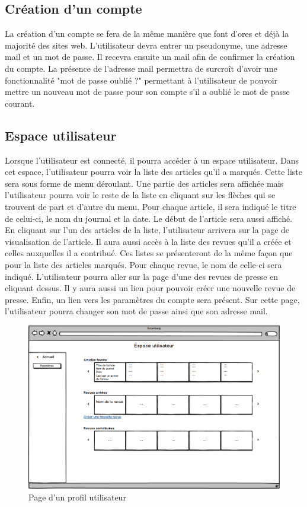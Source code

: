 \subsection{Création d'un compte}
\label{creation_compte}


La création d'un compte se fera de la même manière que font d'ores et déjà la majorité des sites web. L'utilisateur devra entrer un pseudonyme, une adresse mail et un mot de passe. Il recevra ensuite un mail afin de confirmer la création du compte. La présence de l'adresse mail permettra de surcroît d'avoir une fonctionnalité "mot de passe oublié ?" permettant à l'utilisateur de pouvoir mettre un nouveau mot de passe pour son compte s'il a oublié le mot de passe courant.


\subsection{Espace utilisateur}
\label{espace_util}

Lorsque l'utilisateur est connecté, il pourra accéder à un espace utilisateur. Dans cet espace, l'utilisateur pourra voir la liste des articles qu'il a marqués. Cette liste sera sous forme de menu déroulant. Une partie des articles sera affichée mais l'utilisateur pourra voir le reste de la liste en cliquant sur les flèches qui se trouvent de part et d'autre du menu. Pour chaque article, il sera indiqué le titre de celui-ci, le nom du journal et la date. Le début de l'article sera aussi affiché. En cliquant sur l'un des articles de la liste, l'utilisateur arrivera sur la page de visualisation de l'article.
Il aura aussi accès à la liste des revues qu'il a créée et celles auxquelles il a contribué. Ces listes se présenteront de la même façon que pour la liste des articles marqués. Pour chaque revue, le nom de celle-ci sera indiqué. L'utilisateur pourra aller sur la page d'une des revues de presse en cliquant dessus.
Il y aura aussi un lien pour pouvoir créer une nouvelle revue de presse. 
Enfin, un lien vers les paramètres du compte sera présent. Sur cette page, l'utilisateur pourra changer son mot de passe ainsi que son adresse mail.

    \begin{figure}[H]
        \centering
        \includegraphics[width=\textwidth]{figures/Utilisateur.png}
            \caption{Page d'un profil utilisateur}
            \label{fig:utilisateur}
    \end{figure}

